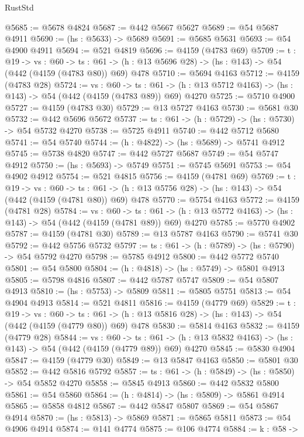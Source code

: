 \begin{lexlean}{RustStd}
\begin{coremodule}
@5685 := @5678 @4824
@5687 := @442 @5667 @5627
@5689 := @54 @5687 @4911
@5690 := (hs : @5633) -> @5689
@5691 := @5685 @5631
@5693 := @54 @4900 @4911
@5694 := @521 @4819
@5696 := @4159 (@4783 @69)
@5709 := {t : @19} ->
  {vs : @60} ->
  {ts : @61} -> (h : @13 @5696 @28) -> (hs : @143) -> @54 (@442 (@4159 (@4783 @80)) @69) @478
@5710 := @5694 @4163
@5712 := @4159 (@4783 @28)
@5724 := {vs : @60} ->
  {ts : @61} -> (h : @13 @5712 @4163) -> (hs : @143) -> @54 (@442 (@4159 (@4783 @89)) @69) @4270
@5725 := @5710 @4900
@5727 := @4159 (@4783 @30)
@5729 := @13 @5727 @4163
@5730 := @5681 @30
@5732 := @442 @5696 @5672
@5737 := {ts : @61} -> (h : @5729) -> (hs : @5730) -> @54 @5732 @4270
@5738 := @5725 @4911
@5740 := @442 @5712 @5680
@5741 := @54 @5740
@5744 := (h : @4822) -> (hs : @5689) -> @5741 @4912
@5745 := @5738 @4820
@5747 := @442 @5727 @5687
@5749 := @54 @5747 @4912
@5750 := (hs : @5693) -> @5749
@5751 := @5745 @5691
@5753 := @54 @4902 @4912
@5754 := @521 @4815
@5756 := @4159 (@4781 @69)
@5769 := {t : @19} ->
  {vs : @60} ->
  {ts : @61} -> (h : @13 @5756 @28) -> (hs : @143) -> @54 (@442 (@4159 (@4781 @80)) @69) @478
@5770 := @5754 @4163
@5772 := @4159 (@4781 @28)
@5784 := {vs : @60} ->
  {ts : @61} -> (h : @13 @5772 @4163) -> (hs : @143) -> @54 (@442 (@4159 (@4781 @89)) @69) @4270
@5785 := @5770 @4902
@5787 := @4159 (@4781 @30)
@5789 := @13 @5787 @4163
@5790 := @5741 @30
@5792 := @442 @5756 @5732
@5797 := {ts : @61} -> (h : @5789) -> (hs : @5790) -> @54 @5792 @4270
@5798 := @5785 @4912
@5800 := @442 @5772 @5740
@5801 := @54 @5800
@5804 := (h : @4818) -> (hs : @5749) -> @5801 @4913
@5805 := @5798 @4816
@5807 := @442 @5787 @5747
@5809 := @54 @5807 @4913
@5810 := (hs : @5753) -> @5809
@5811 := @5805 @5751
@5813 := @54 @4904 @4913
@5814 := @521 @4811
@5816 := @4159 (@4779 @69)
@5829 := {t : @19} ->
  {vs : @60} ->
  {ts : @61} -> (h : @13 @5816 @28) -> (hs : @143) -> @54 (@442 (@4159 (@4779 @80)) @69) @478
@5830 := @5814 @4163
@5832 := @4159 (@4779 @28)
@5844 := {vs : @60} ->
  {ts : @61} -> (h : @13 @5832 @4163) -> (hs : @143) -> @54 (@442 (@4159 (@4779 @89)) @69) @4270
@5845 := @5830 @4904
@5847 := @4159 (@4779 @30)
@5849 := @13 @5847 @4163
@5850 := @5801 @30
@5852 := @442 @5816 @5792
@5857 := {ts : @61} -> (h : @5849) -> (hs : @5850) -> @54 @5852 @4270
@5858 := @5845 @4913
@5860 := @442 @5832 @5800
@5861 := @54 @5860
@5864 := (h : @4814) -> (hs : @5809) -> @5861 @4914
@5865 := @5858 @4812
@5867 := @442 @5847 @5807
@5869 := @54 @5867 @4914
@5870 := (hs : @5813) -> @5869
@5871 := @5865 @5811
@5873 := @54 @4906 @4914
@5874 := @141 @4774
@5875 := @106 @4774
@5884 := {k : @58} ->

\end{coremodule}
\end{lexlean}
